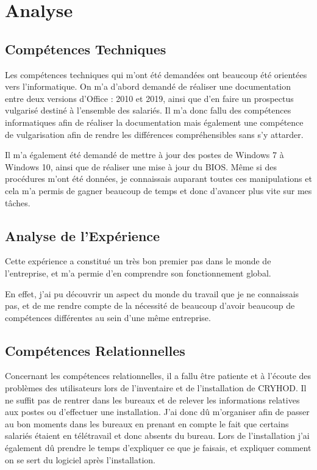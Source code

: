 \chapter{Analyse}


\section{Compétences Techniques}

Les compétences techniques qui m'ont été demandées ont beaucoup été orientées vers l'informatique.
On m'a d'abord demandé de réaliser une documentation entre deux versions d'Office : 2010 et 2019, ainsi que d'en faire un prospectus vulgarisé destiné à l'ensemble des salariés.
Il m'a donc fallu des compétences informatiques afin de réaliser la documentation mais également une compétence de vulgarisation afin de rendre les différences compréhensibles sans s'y attarder.

Il m'a également été demandé de mettre à jour des postes de Windows 7 à Windows 10, ainsi que de réaliser une mise à jour du BIOS.
Même si des procédures m'ont été données, je connaissais auparant toutes ces manipulations et cela m'a permis de gagner beaucoup de temps et donc d'avancer plus vite sur mes tâches.

\section{Analyse de l'Expérience}

Cette expérience a constitué un très bon premier pas dans le monde de l'entreprise, et m'a permie d'en comprendre son fonctionnement global.

En effet, j'ai pu découvrir un aspect du monde du travail que je ne connaissais pas, et de me rendre compte de la nécessité de beaucoup d'avoir beaucoup de compétences différentes au sein d'une même entreprise.


\section{Compétences Relationnelles}

Concernant les compétences relationnelles, il a fallu être patiente et à l'écoute des problèmes des utilisateurs lors de l'inventaire et de l'installation de CRYHOD. 
Il ne suffit pas de rentrer dans les bureaux et de relever les informations relatives aux postes ou d'effectuer une installation. J'ai donc dû m'organiser afin de passer au bon moments dans les bureaux en prenant en compte le fait que certains salariés étaient en télétravail et donc absents du bureau.
Lors de l'installation j'ai également dû prendre le temps d'expliquer ce que je faisais, et expliquer comment on se sert du logiciel après l'installation.

